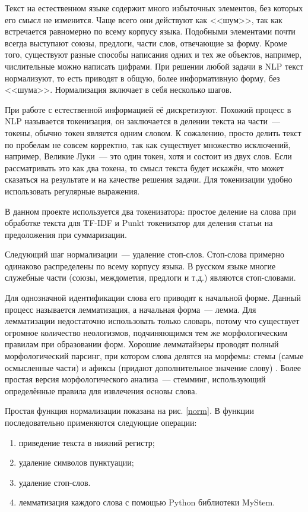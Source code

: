 \documentclass[a4paper, 14pt]{extarticle}
\begin{document}
Текст на естественном языке содержит много избыточных элементов, без которых его смысл не изменится. Чаще всего они действуют как <<шум>>, так как встречается равномерно по всему корпусу языка. Подобными элементами почти всегда выступают союзы, предлоги, части слов, отвечающие за форму. Кроме того, существуют разные способы написания одних и тех же объектов, например, числительные можно написать цифрами. При решении любой задачи в NLP текст нормализуют, то есть приводят в общую, более информативную форму, без <<шума>>. Нормализация включает в себя несколько шагов.

При работе с естественной информацией её дискретизуют. Похожий процесс в NLP называется токенизация, он заключается в делении текста на части~--- токены, обычно токен является одним словом. К сожалению, просто делить текст по пробелам не совсем корректно, так как существует множество исключений, например, Великие Луки~--- это один токен, хотя и состоит из двух слов. Если рассматривать это как два токена, то смысл текста будет искажён, что может сказаться на результате и на качестве решения задачи. Для токенизации удобно использовать регулярные выражения.

В данном проекте используется два токенизатора: простое деление на слова при обработке текста для TF-IDF и Punkt токенизатор для деления статьи на предоложения при суммаризации.

Следующий шаг нормализации~--- удаление стоп-слов. Стоп-слова примерно одинаково распределены по всему корпусу языка. В русском языке многие служебные части (союзы, междометия, предлоги и т.д.) являются стоп-словами.

Для однозначной идентификации слова его приводят к начальной форме. Данный процесс называется лемматизация, а начальная форма~--- лемма. Для лемматизации недостаточно использовать только словарь, потому что существует огромное количество неологизмов, подчиняющимся тем же морфологическим правилам при образовании форм. Хорошие лемматайзеры проводят полный морфологический парсинг, при котором слова делятся на морфемы: стемы (самые осмысленные части) и афиксы (придают дополнительное значение слову) \cite{c2}. Более простая версия морфологического анализа~--- стемминг, использующий определённые правила для извлечения основы слова.


Простая функция нормализации показана на рис. \ref{norm}. В функции последовательно применяются следующие операции:
\begin{enumerate}
	\item приведение текста в нижний регистр;
	\item удаление символов пунктуации;
	\item удаление стоп-слов.
	\item лемматизация каждого слова с помощью Python библиотеки MyStem.
\end{enumerate}
\end{document}
